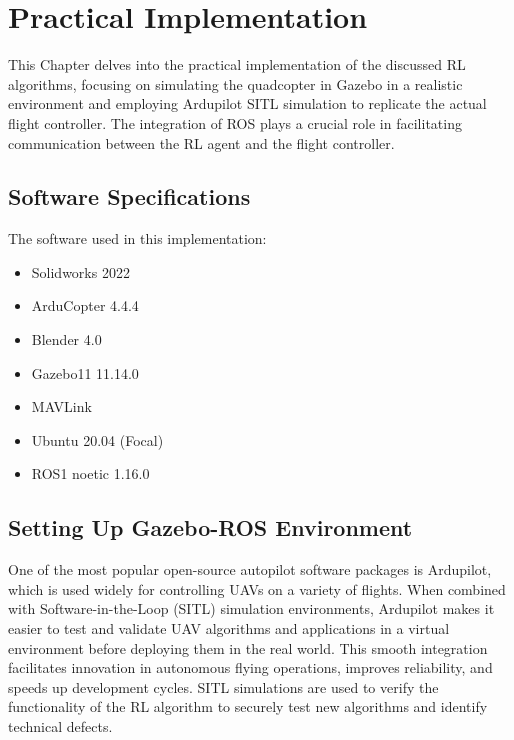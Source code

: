 \chapter{Practical Implementation}
    This Chapter delves into the practical implementation of the discussed RL algorithms, focusing on simulating the quadcopter in Gazebo in a realistic environment and employing Ardupilot SITL simulation to replicate the actual flight controller. The integration of ROS plays a crucial role in facilitating communication between the RL agent and the flight controller.
    \section{Software Specifications}
    \color{black}
    The software used in this implementation:\\
    \begin{itemize}        
        \item Solidworks 2022 \cite{solidworks}
        \item ArduCopter 4.4.4 \cite{arducopter}
        \item Blender 4.0 \cite{blender}
        \item Gazebo11 11.14.0 \cite{Gazebo}
        \item MAVLink \cite{mavlink}
        \item Ubuntu 20.04 (Focal) \cite{ubutnu}
        \item ROS1 noetic 1.16.0 \cite{ros}
    \end{itemize}
    \section{Setting Up Gazebo-ROS Environment}
        One of the most popular open-source autopilot software packages is Ardupilot, which is used widely for controlling UAVs on a variety of flights. When combined with Software-in-the-Loop (SITL) simulation environments, Ardupilot makes it easier to test and validate UAV algorithms and applications in a virtual environment before deploying them in the real world. This smooth integration facilitates innovation in autonomous flying operations, improves reliability, and speeds up development cycles. SITL simulations are used to verify the functionality of the RL algorithm to securely test new algorithms and identify technical defects.
